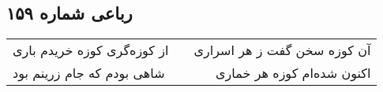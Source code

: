 \begin{center}
\section*{رباعی شماره ۱۵۹}
\label{sec:sh159}
\begin{longtable}{l p{0.5cm} r}
از کوزه‌گری کوزه خریدم باری
&&
آن کوزه سخن گفت ز هر اسراری
\\
شاهی بودم که جام زرینم بود
&&
اکنون شده‌ام کوزه هر خماری
\\
\end{longtable}
\end{center}
